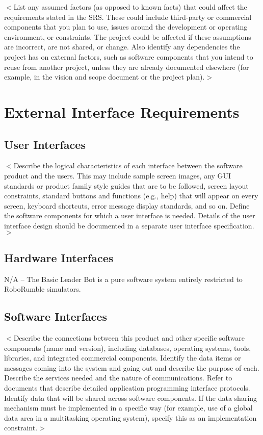 \documentclass{scrreprt}
\begin{document}
$<$List any assumed factors (as opposed to known facts) that could affect the 
requirements stated in the SRS. These could include third-party or commercial 
components that you plan to use, issues around the development or operating 
environment, or constraints. The project could be affected if these assumptions 
are incorrect, are not shared, or change. Also identify any dependencies the 
project has on external factors, such as software components that you intend to 
reuse from another project, unless they are already documented elsewhere (for 
example, in the vision and scope document or the project plan).$>$


\chapter{External Interface Requirements}

\section{User Interfaces}
$<$Describe the logical characteristics of each interface between the software 
product and the users. This may include sample screen images, any GUI standards 
or product family style guides that are to be followed, screen layout 
constraints, standard buttons and functions (e.g., help) that will appear on 
every screen, keyboard shortcuts, error message display standards, and so on.  
Define the software components for which a user interface is needed. Details of 
the user interface design should be documented in a separate user interface 
specification.$>$

\section{Hardware Interfaces}
N/A -- The Basic Leader Bot is a pure software system entirely restricted to RoboRumble simulators.

\section{Software Interfaces}
$<$Describe the connections between this product and other specific software 
components (name and version), including databases, operating systems, tools, 
libraries, and integrated commercial components. Identify the data items or 
messages coming into the system and going out and describe the purpose of each.  
Describe the services needed and the nature of communications. Refer to 
documents that describe detailed application programming interface protocols.  
Identify data that will be shared across software components. If the data 
sharing mechanism must be implemented in a specific way (for example, use of a 
global data area in a multitasking operating system), specify this as an 
implementation constraint.$>$
\end{document}
